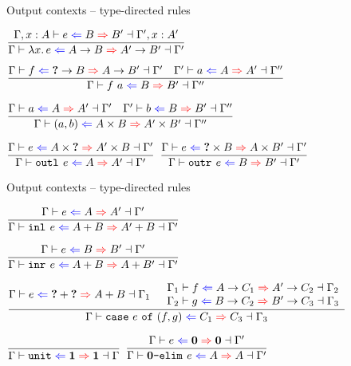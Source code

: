 \documentclass{beamer}
\begin{document}
\begin{frame}{Output contexts -- type-directed rules}

\begin{center}
  $\infrule{\outctx[\extend{\Gamma}{x}{A}]{e}{B}{B'}[\extend{\Gamma'}{x}{A'}]}{\outctx{\fun{x}{e}}{\Fun{A}{B}}{\Fun{A'}{B'}}}$

  \vspace{2em}

  $\infrule{\outctx[\Gamma]{f}{\Fun{\Hole}{B}}{\Fun{A}{B'}}[\Gamma'] \quad \outctx[\Gamma']{a}{A}{A'}[\Gamma'']}{\outctx[\Gamma]{\app{f}{a}}{B}{B'}[\Gamma'']}$

  \vspace{2em}

  $\infrule{\outctx[\Gamma]{a}{A}{A'}[\Gamma'] \quad \outctx[\Gamma']{b}{B}{B'}[\Gamma'']}{\outctx[\Gamma]{\pair{a}{b}}{\Prod{A}{B}}{\Prod{A'}{B'}}[\Gamma'']}$

  \vspace{2em}

  $\infrule{\outctx{e}{\Prod{A}{\Hole}}{\Prod{A'}{B}}}{\outctx{\outl{e}}{A}{A'}}$
  \quad
  $\infrule{\outctx{e}{\Prod{\Hole}{B}}{\Prod{A}{B'}}}{\outctx{\outr{e}}{B}{B'}}$
\end{center}

\end{frame}

\begin{frame}{Output contexts -- type-directed rules}

\begin{center}
  $\infrule{\outctx{e}{A}{A'}}{\outctx{\inl{e}}{\Sum{A}{B}}{\Sum{A'}{B}}}$

  \vspace{2em}

  $\infrule{\outctx{e}{B}{B'}}{\outctx{\inr{e}}{\Sum{A}{B}}{\Sum{A}{B'}}}$

  \vspace{2em}

  $\infrule{\outctx[\Gamma]{e}{\Sum{\Hole}{\Hole}}{\Sum{A}{B}}[\Gamma_1] \quad \begin{array}{c} \outctx[\Gamma_1]{f}{\Fun{A}{C_1}}{\Fun{A'}{C_2}}[\Gamma_2] \\ \outctx[\Gamma_2]{g}{\Fun{B}{C_2}}{\Fun{B'}{C_3}}[\Gamma_3] \end{array}}{\outctx[\Gamma]{\case{e}{f}{g}}{C_1}{C_3}[\Gamma_3]}$

  \vspace{2em}

  $\infrule{}{\outctx[\Gamma]{\unit}{\Unit}{\Unit}[\Gamma]}$
  \quad
  $\infrule{\outctx{e}{\Empty}{\Empty}}{\outctx{\emptyelim{e}}{A}{A}}$
\end{center}

\end{frame}
\end{document}
